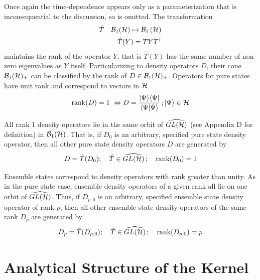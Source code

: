 \noindent Once again the time-dependence appears only as a parameterization
that is inconsequential to the discussion, so is omitted. The transformation 
\begin{eqnarray}
\hat{T} &&{\cal B}_{1}({\cal H})\mapsto {\cal B}_{1}\left( {\cal H}\right) 
\nonumber \\
&&\hat{T}(Y)=TYT^{\dagger }
\end{eqnarray}%
maintains the rank of the operator $Y$, that is $\hat{T}(Y)$ has the same
number of non-zero eigenvalues as $Y$ itself. Particularizing to density
operators $D$, their cone ${\cal B}_{1}({\cal H})_{+}$ can be classified by
the rank of $D\in {\cal B}_{1}({\cal H})_{+}$. Operators for pure states
have unit rank and correspond to vectors in ${\cal H}$ 
\begin{equation}
\mathop{\rm rank}\nolimits(D)=1\,\,\Leftrightarrow D=\frac{|\Psi \rangle
\langle \Psi |}{\langle \Psi |\Psi \rangle }\,;|\Psi \rangle \in {\cal H}
\end{equation}

All rank 1 density operators lie in the same orbit of $\widehat{GL({\cal H})}
$ (see Appendix D for definition) in ${\cal B}_{1}({\cal H})$. That is, if $%
D_{0}$ is an arbitrary, specified pure state density operator, then all
other pure state density operators $D$ are generated by 
\begin{equation}
D=\hat{T}(D_{0});\quad \hat{T}\in \widehat{GL({\cal H})}\,;\quad \mathop{\rm
rank}\nolimits (D_{0})=1
\end{equation}

Ensemble states correspond to density operators with rank greater than
unity. As in the pure state case, ensemble density operators of a given rank
all lie on one orbit of $\widehat{GL({\cal H})}$. Thus, if $D_{p,0}$ is an
arbitrary, specified ensemble state density operator of rank $p$, then all
other ensemble state density operators of the same rank $D_{p}$ are
generated by 
\begin{equation}
D_{p}=\hat{T}(D_{p,0});\quad \hat{T}\in \widehat{GL({\cal H})}\,;\quad %
\mathop{\rm rank}\nolimits (D_{p,0})=p
\end{equation}

\section{Analytical Structure of the Kernel}

